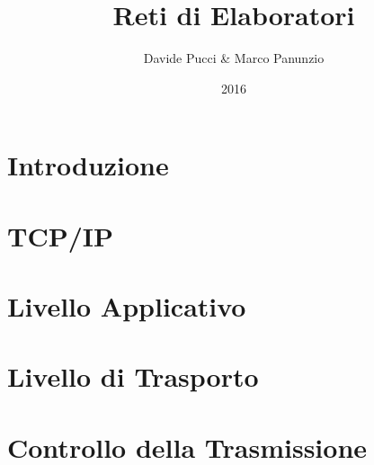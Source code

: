 

\title{Reti di Elaboratori}
\author{Davide Pucci \& Marco Panunzio}
\date{2016}



\maketitle

\tableofcontents

\chapter{Introduzione}


\chapter{TCP/IP}


\chapter{Livello Applicativo}


\chapter{Livello di Trasporto}


\chapter{Controllo della Trasmissione}


